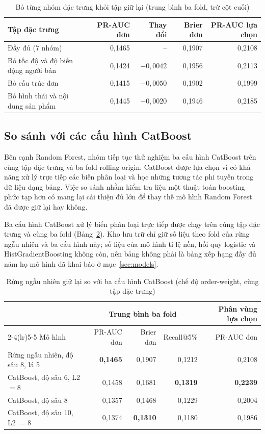 \documentclass[12pt,a4paper]{report}
\begin{document}
\begin{table}[htbp]\centering\small
\caption{Bỏ từng nhóm đặc trưng khỏi tập giữ lại (trung bình ba fold, trừ cột cuối)}\label{tab:res-loo}
\begin{tabular}{p{5.6cm}rrrr}
\toprule
Tập đặc trưng & PR-AUC đơn & Thay đổi & Brier đơn & PR-AUC lựa chọn \\
\midrule
Đầy đủ (7 nhóm) & 0,1465 & -- & 0,1907 & 0,2108 \\
Bỏ tốc độ và độ biến động người bán & 0,1424 & $-0{,}0042$ & 0,1956 & 0,2113 \\
Bỏ cấu trúc đơn & 0,1415 & $-0{,}0050$ & 0,1902 & 0,1999 \\
Bỏ hình thái và nội dung sản phẩm & 0,1445 & $-0{,}0020$ & 0,1946 & 0,2185 \\
\bottomrule
\end{tabular}
\end{table}

\subsection{So sánh với các cấu hình CatBoost}\label{subsec:tab-catboost}

Bên cạnh Random Forest, nhóm tiếp tục thử nghiệm ba cấu hình CatBoost trên cùng tập đặc trưng và ba fold rolling-origin. CatBoost được lựa chọn vì có khả năng xử lý trực tiếp các biến phân loại và học những tương tác phi tuyến trong dữ liệu dạng bảng. Việc so sánh nhằm kiểm tra liệu một thuật toán boosting phức tạp hơn có mang lại cải thiện đủ lớn để thay thế mô hình Random Forest đã được giữ lại hay không.

Ba cấu hình CatBoost xử lý biến phân loại trực tiếp được chạy trên cùng tập đặc trưng và cùng ba fold (Bảng~\ref{tab:res-catboost}). Kho lưu trữ chỉ giữ số liệu theo fold của rừng ngẫu nhiên và ba cấu hình này; số liệu của mô hình tỉ lệ nền, hồi quy logistic và HistGradientBoosting không còn, nên bảng không phải là bảng xếp hạng đầy đủ năm họ mô hình đã khai báo ở mục~\ref{sec:models}.

\begin{table}[htbp]\centering\small
\caption{Rừng ngẫu nhiên giữ lại so với ba cấu hình CatBoost (chế độ order-weight, cùng tập đặc trưng)}\label{tab:res-catboost}
\begin{tabular}{lrrrr}
\toprule
& \multicolumn{3}{c}{Trung bình ba fold} & Phân vùng lựa chọn \\
\cmidrule(lr){2-4}\cmidrule(lr){5-5}
Mô hình & PR-AUC đơn & Brier đơn & Recall@5\% & PR-AUC đơn \\
\midrule
Rừng ngẫu nhiên, độ sâu 8, lá 5 & \textbf{0,1465} & 0,1907 & 0,1212 & 0,2108 \\
CatBoost, độ sâu 6, L2 $=8$ & 0,1458 & 0,1681 & \textbf{0,1319} & \textbf{0,2239} \\
CatBoost, độ sâu 8 & 0,1357 & 0,1468 & 0,1229 & 0,2004 \\
CatBoost, độ sâu 10, L2 $=8$ & 0,1374 & \textbf{0,1310} & 0,1180 & 0,1986 \\
\bottomrule
\end{tabular}
\end{table}
\end{document}
